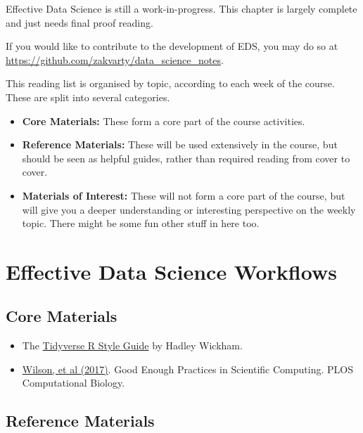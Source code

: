 \documentclass[
  12pt,
]{book}
\providecommand{\tightlist}{%
  \setlength{\itemsep}{0pt}\setlength{\parskip}{0pt}}
\begin{document}
Effective Data Science is still a work-in-progress. This chapter is largely complete and just needs final proof reading.

If you would like to contribute to the development of EDS, you may do so at \url{https://github.com/zakvarty/data_science_notes}.

This reading list is organised by topic, according to each week of the course. These are split into several categories.

\begin{itemize}
\item
  \textbf{Core Materials:} These form a core part of the course activities.
\item
  \textbf{Reference Materials:} These will be used extensively in the course, but should be seen as helpful guides, rather than required reading from cover to cover.
\item
  \textbf{Materials of Interest:} These will not form a core part of the course, but will give you a deeper understanding or interesting perspective on the weekly topic. There might be some fun other stuff in here too.
\end{itemize}

\hypertarget{workflows-reading}{%
\section{Effective Data Science Workflows}\label{workflows-reading}}

\hypertarget{core-materials}{%
\subsection*{Core Materials}\label{core-materials}}

\begin{itemize}
\tightlist
\item
  The \href{https://style.tidyverse.org/}{Tidyverse R Style Guide} by Hadley Wickham.
\end{itemize}

\begin{itemize}
\tightlist
\item
  \href{https://journals.plos.org/ploscompbiol/article?id=10.1371/journal.pcbi.1005510\&ref=https://githubhelp.com}{Wilson, et al (2017)}. Good Enough Practices in Scientific Computing. PLOS Computational Biology.
\end{itemize}

\hypertarget{reference-materials}{%
\subsection*{Reference Materials}\label{reference-materials}}
\end{document}
